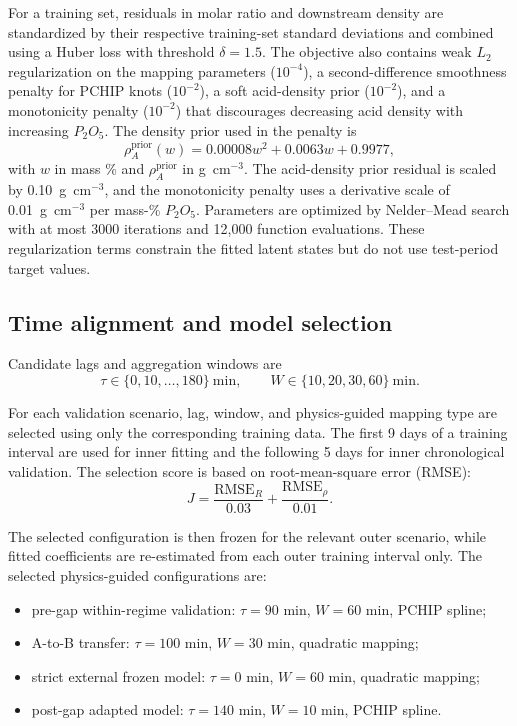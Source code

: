 \documentclass[preprint,12pt,authoryear]{elsarticle}
\begin{document}
For a training set, residuals in molar ratio and downstream density are standardized by their respective training-set standard deviations and combined using a Huber loss with threshold $\delta=1.5$. The objective also contains weak $L_2$ regularization on the mapping parameters ($10^{-4}$), a second-difference smoothness penalty for PCHIP knots ($10^{-2}$), a soft acid-density prior ($10^{-2}$), and a monotonicity penalty ($10^{-2}$) that discourages decreasing acid density with increasing $P_2O_5$. The density prior used in the penalty is
\begin{equation}
\rho_A^{\mathrm{prior}}(w)=0.00008w^2+0.0063w+0.9977,
\end{equation}
with $w$ in mass \% and $\rho_A^{\mathrm{prior}}$ in g~cm$^{-3}$. The acid-density prior residual is scaled by 0.10~g~cm$^{-3}$, and the monotonicity penalty uses a derivative scale of 0.01~g~cm$^{-3}$ per mass-\% $P_2O_5$. Parameters are optimized by Nelder--Mead search with at most 3000 iterations and 12,000 function evaluations. These regularization terms constrain the fitted latent states but do not use test-period target values.

\subsection{Time alignment and model selection}

Candidate lags and aggregation windows are
\begin{equation}
\tau\in\{0,10,\ldots,180\}\ \mathrm{min},
\qquad
W\in\{10,20,30,60\}\ \mathrm{min}.
\end{equation}

For each validation scenario, lag, window, and physics-guided mapping type are selected using only the corresponding training data. The first 9 days of a training interval are used for inner fitting and the following 5 days for inner chronological validation. The selection score is based on root-mean-square error (RMSE):
\begin{equation}
J=
\frac{\mathrm{RMSE}_R}{0.03}
+
\frac{\mathrm{RMSE}_{\rho}}{0.01}.
\end{equation}

The selected configuration is then frozen for the relevant outer scenario, while fitted coefficients are re-estimated from each outer training interval only. The selected physics-guided configurations are:
\begin{itemize}[leftmargin=1.5em]
\item pre-gap within-regime validation: $\tau=90$ min, $W=60$ min, PCHIP spline;
\item A-to-B transfer: $\tau=100$ min, $W=30$ min, quadratic mapping;
\item strict external frozen model: $\tau=0$ min, $W=60$ min, quadratic mapping;
\item post-gap adapted model: $\tau=140$ min, $W=10$ min, PCHIP spline.
\end{itemize}
\end{document}
